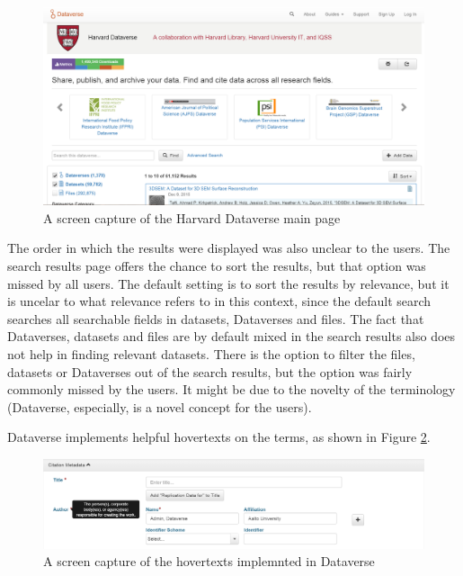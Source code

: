 \begin{figure}
    \begin{centering}
        \includegraphics[width=\textwidth]{images/search_main_page}
    \end{centering}
    \caption{A screen capture of the Harvard Dataverse main page}
    \label{fig:search_main_page}
\end{figure}

The order in which the results were displayed was also unclear to the users.
The search results page offers the chance to sort the results, but that option
was missed by all users. The default setting is to sort the results by
relevance, but it is uncelar to what relevance refers to in this context, since
the default search searches all searchable fields in datasets, Dataverses and files.
The fact that Dataverses, datasets and files are by default mixed in the search
results also does not help in finding relevant datasets. There is the option to
filter the files, datasets or Dataverses out of the search results, but the
option was fairly commonly missed by the users. It might be due to the novelty
of the terminology (Dataverse, especially, is a novel concept for the users).

Dataverse implements helpful hovertexts on the terms, as shown in Figure
\ref{fig:hovertext}.

\begin{figure}
    \begin{centering}
        \includegraphics[width=\textwidth]{images/hovertext}
    \end{centering}
    \caption{A screen capture of the hovertexts implemnted in Dataverse}
    \label{fig:hovertext}
\end{figure}



